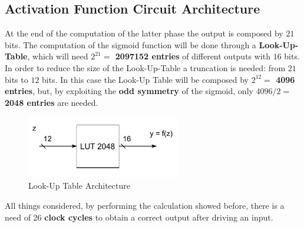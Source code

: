 \subsection{Activation Function Circuit Architecture}
At the end of the computation of the latter phase the output is composed by $21$ bits. The computation of the sigmoid function will be done through a \textbf{Look-Up-Table}, which will need \textbf{$2^{21} = $ 2097152 entries} of different outputs with $16$ bits. In order to reduce the size of the Look-Up-Table a truncation is needed: from $21$ bits to $12$ bits. In this case the Look-Up Table will be composed by \textbf{$2^{12} = $ 4096 entries}, but, by exploiting the \textbf{odd symmetry} of the sigmoid, only \textbf{$4096/2 = $ 2048 entries} are needed.
\begin{figure}[H]
	\centering
	\includegraphics[width=0.6\textwidth]{img/architecture_lut_optimized.pdf}
	\caption{Look-Up Table Architecture}
\end{figure}

All things considered, by performing the calculation showed before, there is a need of 26 \textbf{clock cycles} to obtain a correct output after driving an input.
 